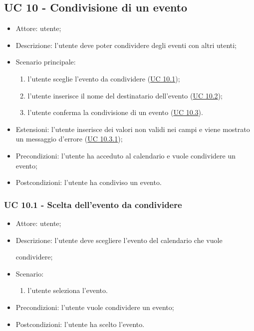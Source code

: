 \subsection{UC 10 - Condivisione di un evento}
\begin{itemize}
    \item Attore: utente;
    \item Descrizione: l'utente deve poter condividere degli eventi con altri utenti;
    \item Scenario principale:
        \begin{enumerate}
        \item l'utente sceglie l'evento da condividere (\hyperref[sec: UC 10.1]{UC 10.1});
        \item l'utente inserisce il nome del destinatario dell'evento (\hyperref[sec: UC 10.2]{UC 10.2});
        \item l'utente conferma la condivisione di un evento (\hyperref[sec: UC 10.3]{UC 10.3}).
        \end{enumerate}
    \item Estensioni: l'utente inserisce dei valori non validi nei campi e viene mostrato un messaggio d'errore (\hyperref[sec: UC 10.3.1]{UC 10.3.1});
    \item Precondizioni: l'utente ha acceduto al calendario e vuole condividere un evento;
    \item Postcondizioni: l'utente ha condiviso un evento.
\end{itemize}

\subsubsection{UC 10.1 - Scelta dell'evento da condividere} \label{sec: UC 10.1}
\begin{itemize}
    \item Attore: utente;
    \item Descrizione: l'utente deve scegliere l'evento del calendario che vuole \par condividere;
    \item Scenario:
        \begin{enumerate}
        \item l'utente seleziona l'evento.
        \end{enumerate}
    
    \item Precondizioni: l'utente vuole condividere un evento;
    \item Postcondizioni: l'utente ha scelto l'evento.
\end{itemize}



